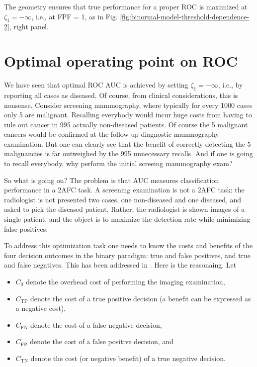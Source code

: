 \documentclass[
]{book}
\providecommand{\tightlist}{%
  \setlength{\itemsep}{0pt}\setlength{\parskip}{0pt}}
\begin{document}
The geometry ensures that true performance for a proper ROC is maximized at \(\zeta_1 = -\infty\), i.e., at FPF = 1, as in Fig. \ref{fig:binormal-model-threshold-dependence-2}, right panel.

\hypertarget{binormal-model-optimal-op-pt}{%
\section{Optimal operating point on ROC}\label{binormal-model-optimal-op-pt}}

We have seen that optimal ROC AUC is achieved by setting \(\zeta_1 = -\infty\), i.e., by reporting all cases as diseased. Of course, from clinical considerations, this is nonsense. Consider screening mammography, where typically for every 1000 cases only 5 are malignant. Recalling everybody would incur huge costs from having to rule out cancer in 995 actually non-diseased patients. Of course the 5 malignant cancers would be confirmed at the follow-up diagnostic mammography examination. But one can clearly see that the benefit of correctly detecting the 5 malignancies is far outweighed by the 995 unnecessary recalls. And if one is going to recall everybody, why perform the initial screeing mammography exam?

So what is going on? The problem is that AUC measures classification performance in a 2AFC task. A screening examination is not a 2AFC task: the radiologist is not presented two cases, one non-diseased and one diseased, and asked to pick the diseased patient. Rather, the radiologist is shown images of a single patient, and the object is to maximize the detection rate while minimizing false positives.

To address this optimization task one needs to know the costs and benefits of the four decision outcomes in the binary paradigm: true and false positives, and true and false negatives. This has been addressed in \citep{metz1978rocmethodology}. Here is the reasonaing. Let

\begin{itemize}
\tightlist
\item
  \(C_0\) denote the overhead cost of performing the imaging examination,
\item
  \(C_{\text{TP}}\) denote the cost of a true positive decision (a benefit can be expressed as a negative cost),
\item
  \(C_{\text{FN}}\) denote the cost of a false negative decision,
\item
  \(C_{\text{FP}}\) denote the cost of a false positive decision, and
\item
  \(C_{\text{TN}}\) denote the cost (or negative benefit) of a true negative decision.
\end{itemize}
\end{document}
